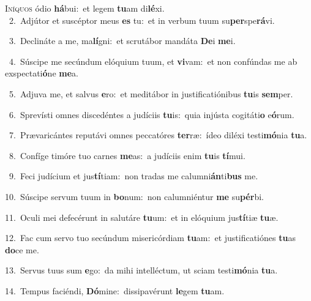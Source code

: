\lettrine{\initial\textcolor{\initialcolor}{I}}{níquos} ódio \textbf{há}\-bui:~\star et legem \textbf{tu}\-am di\-\textbf{lé}\-xi.\\
{\numbfont\textcolor{\numbcolor}{~2.}}~Adjútor et suscéptor meus \textbf{es} tu:~\star et in verbum tuum su\-\textbf{per}\-spe\-\textbf{rá}\-vi.\par
{\numbfont\textcolor{\numbcolor}{~3.}}~Declináte a me, ma\-\textbf{lí}\-gni:~\star et scrutábor mandáta \textbf{De}\-i \textbf{me}\-i.\par
{\numbfont\textcolor{\numbcolor}{~4.}}~Súscipe me secúndum elóquium tuum, et \textbf{vi}\-vam:~\star et non confúndas me ab exspectati\-\textbf{ó}\-ne \textbf{me}\-a.\par
{\numbfont\textcolor{\numbcolor}{~5.}}~Adjuva me, et salvus \textbf{e}\-ro:~\star et meditábor in justificatiónibus \textbf{tu}\-is \textbf{sem}\-per.\par
{\numbfont\textcolor{\numbcolor}{~6.}}~Sprevísti omnes discedéntes a judíciis \textbf{tu}\-is:~\star quia injústa cogitáti\textbf{o} e\-\textbf{ó}\-rum.\par
{\numbfont\textcolor{\numbcolor}{~7.}}~Prævaricántes reputávi omnes peccatóres \textbf{ter}\-ræ:~\star ídeo diléxi testi\-\textbf{mó}\-nia \textbf{tu}\-a.\par
{\numbfont\textcolor{\numbcolor}{~8.}}~Confíge timóre tuo carnes \textbf{me}\-as:~\star a judíciis enim \textbf{tu}\-is \textbf{tí}\-mui.\par
{\numbfont\textcolor{\numbcolor}{~9.}}~Feci judícium et jus\-\textbf{tí}\-tiam:~\star non tradas me calumni\-\textbf{án}\-ti\textbf{bus} me.\par
{\numbfont\textcolor{\numbcolor}{10.}}~Súscipe servum tuum in \textbf{bo}\-num:~\star non calumniéntur \textbf{me} su\-\textbf{pér}\-bi.\par
{\numbfont\textcolor{\numbcolor}{11.}}~Oculi mei defecérunt in salutáre \textbf{tu}\-um:~\star et in elóquium jus\-\textbf{tí}\-tiæ \textbf{tu}\-æ.\par
{\numbfont\textcolor{\numbcolor}{12.}}~Fac cum servo tuo secúndum misericórdiam \textbf{tu}\-am:~\star et justificatiónes \textbf{tu}\-as \textbf{do}\-ce me.\par
{\numbfont\textcolor{\numbcolor}{13.}}~Servus tuus sum \textbf{e}\-go:~\star da mihi intelléctum, ut sciam testi\-\textbf{mó}\-nia \textbf{tu}\-a.\par
{\numbfont\textcolor{\numbcolor}{14.}}~Tempus faciéndi, \textbf{Dó}\-mine:~\star dissipavérunt \textbf{le}\-gem \textbf{tu}\-am.\par
